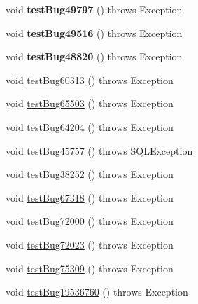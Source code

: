 \begin{DoxyCompactItemize}
void {\bfseries test\+Bug49797} ()  throws Exception 
\item 
\mbox{\label{classtestsuite_1_1regression_1_1_result_set_regression_test_a88928c884a03c36c24fab5012551fb34}} 
void {\bfseries test\+Bug49516} ()  throws Exception 
\item 
\mbox{\label{classtestsuite_1_1regression_1_1_result_set_regression_test_a5c528e2d33add6967d896cad89b97c8d}} 
void {\bfseries test\+Bug48820} ()  throws Exception 
\item 
void \mbox{\hyperlink{classtestsuite_1_1regression_1_1_result_set_regression_test_a0b66981060f0cf894fcac0ffacf7280d}{test\+Bug60313}} ()  throws Exception 
\item 
void \mbox{\hyperlink{classtestsuite_1_1regression_1_1_result_set_regression_test_aac9dd9e40e53b5f7b899b239d7c08406}{test\+Bug65503}} ()  throws Exception 
\item 
void \mbox{\hyperlink{classtestsuite_1_1regression_1_1_result_set_regression_test_a4c82635b5ff90ca43310f0523bf0b8a5}{test\+Bug64204}} ()  throws Exception 
\item 
void \mbox{\hyperlink{classtestsuite_1_1regression_1_1_result_set_regression_test_a38aab06b61d59c04df60b2ffd7dd9861}{test\+Bug45757}} ()  throws S\+Q\+L\+Exception 
\item 
void \mbox{\hyperlink{classtestsuite_1_1regression_1_1_result_set_regression_test_ae79fca0bd7d22ac046c30b0e69ae46e5}{test\+Bug38252}} ()  throws Exception 
\item 
void \mbox{\hyperlink{classtestsuite_1_1regression_1_1_result_set_regression_test_a1ef1850491041aac8a3c98968d839a10}{test\+Bug67318}} ()  throws Exception 
\item 
void \mbox{\hyperlink{classtestsuite_1_1regression_1_1_result_set_regression_test_ac5cb7a4e2ccabb68566100d643272bb4}{test\+Bug72000}} ()  throws Exception 
\item 
void \mbox{\hyperlink{classtestsuite_1_1regression_1_1_result_set_regression_test_a86a107fd1b712bfc306b455d84d42572}{test\+Bug72023}} ()  throws Exception 
\item 
void \mbox{\hyperlink{classtestsuite_1_1regression_1_1_result_set_regression_test_a21e609d74da6fad0483aeeec66375c7d}{test\+Bug75309}} ()  throws Exception 
\item 
void \mbox{\hyperlink{classtestsuite_1_1regression_1_1_result_set_regression_test_a84aedc11c7b191cccc83a821ad7b3927}{test\+Bug19536760}} ()  throws Exception 

\end{DoxyCompactItemize}
